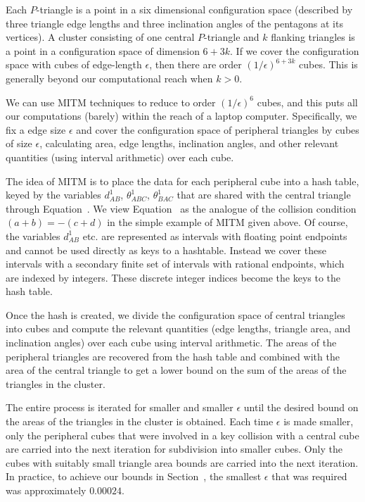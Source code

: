 Each $P$-triangle is a point in a six dimensional configuration space
(described by three triangle edge lengths and three inclination angles
of the pentagons at its vertices).  A cluster consisting of one
central $P$-triangle and $k$ flanking triangles is a point in a
configuration space of dimension $6 + 3k$.  If we cover the
configuration space with cubes of edge-length $\epsilon$, then there
are order $(1/\epsilon)^{6+3k}$ cubes.  This is generally beyond our
computational reach when $k>0$.

We can use MITM techniques to reduce to order $(1/\epsilon)^6$ cubes,
and this puts all our computations (barely) within the reach of a
laptop computer.  Specifically, we fix a edge size $\epsilon$ and
cover the configuration space of peripheral triangles by cubes of size
$\epsilon$, calculating area, edge lengths, inclination angles, and
other relevant quantities (using interval arithmetic) over each cube.

The idea of MITM is to place the data for each peripheral cube into a
hash table, keyed by the variables $d^1_{AB}$, $\theta^1_{ABC}$,
$\theta^1_{BAC}$ that are shared with the central triangle through
Equation~.  We view Equation~ as
the analogue of the collision condition $(a+b) = -(c+d)$ in the simple
example of MITM given above.  Of course, the variables $d^1_{AB}$
etc. are represented as intervals with floating point endpoints and
cannot be used directly as keys to a hashtable.  Instead we cover
these intervals with a secondary finite set of intervals with rational
endpoints, which are indexed by integers.  These discrete integer
indices become the keys to the hash table.  

Once the hash is created, we divide the configuration space of central
triangles into cubes and compute the relevant quantities (edge
lengths, triangle area, and inclination angles) over each cube using
interval arithmetic.  The areas of the peripheral triangles are
recovered from the hash table and combined with the area of the
central triangle to get a lower bound on the sum of the areas of the
triangles in the cluster.

The entire process is iterated for smaller and smaller $\epsilon$
until the desired bound on the areas of the triangles in the cluster
is obtained.  Each time $\epsilon$ is made smaller, only the
peripheral cubes that were involved in a key collision with a central
cube are carried into the next iteration for subdivision into smaller
cubes.  Only the cubes with suitably small triangle area bounds are
carried into the next iteration.  In practice, to achieve our bounds
in Section~, the smallest $\epsilon$ that was required
was approximately $0.00024$.

